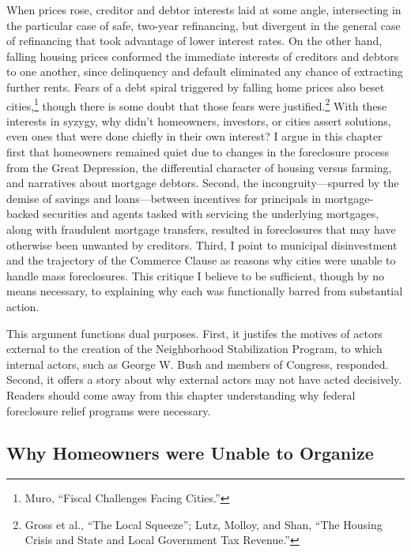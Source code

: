 \documentclass[
]{article}
\let\rmarkdownfootnote\footnote%
\def\footnote{\protect\rmarkdownfootnote}
\begin{document}
When prices rose, creditor and debtor interests laid at some angle,
intersecting in the particular case of safe, two-year refinancing, but
divergent in the general case of refinancing that took advantage of
lower interest rates. On the other hand, falling housing prices
conformed the immediate interests of creditors and debtors to one
another, since delinquency and default eliminated any chance of
extracting further rents. Fears of a debt spiral triggered by falling
home prices also beset cities,\footnote{Muro, ``Fiscal Challenges Facing
  Cities.''} though there is some doubt that those fears were
justified.\footnote{Gross et al., ``The Local Squeeze''; Lutz, Molloy,
  and Shan, ``The Housing Crisis and State and Local Government Tax
  Revenue.''} With these interests in syzygy, why didn't homeowners,
investors, or cities assert solutions, even ones that were done chiefly
in their own interest? I argue in this chapter first that homeowners
remained quiet due to changes in the foreclosure process from the Great
Depression, the differential character of housing versus farming, and
narratives about mortgage debtors. Second, the incongruity---spurred by
the demise of savings and loans---between incentives for principals in
mortgage-backed securities and agents tasked with servicing the
underlying mortgages, along with fraudulent mortgage transfers, resulted
in foreclosures that may have otherwise been unwanted by creditors.
Third, I point to municipal disinvestment and the trajectory of the
Commerce Clause as reasons why cities were unable to handle mass
foreclosures. This critique I believe to be sufficient, though by no
means necessary, to explaining why each was functionally barred from
substantial action.

This argument functions dual purposes. First, it justifes the motives of
actors external to the creation of the Neighborhood Stabilization
Program, to which internal actors, such as George W. Bush and members of
Congress, responded. Second, it offers a story about why external actors
may not have acted decisively. Readers should come away from this
chapter understanding why federal foreclosure relief programs were
necessary.

\hypertarget{homeowners}{%
\subsection{Why Homeowners were Unable to Organize}\label{homeowners}}
\end{document}
